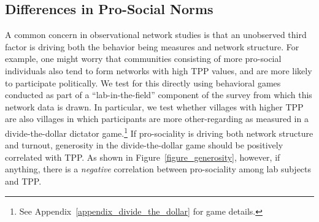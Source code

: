 \documentclass[12pt]{article}
\begin{document}

\subsection{Differences in Pro-Social Norms}

A common concern in observational network studies is that an unobserved third factor is driving both the behavior being measures and network structure. For example, one might worry that communities consisting of more pro-social individuals also tend to form networks with high TPP values, and are more likely to participate politically. We test for this directly using behavioral games conducted as part of a ``lab-in-the-field'' component of the survey from which this network data is drawn. In particular, we test whether villages with higher TPP are also villages in which participants are more other-regarding as measured in a divide-the-dollar dictator game.\footnote{See Appendix~\ref{appendix_divide_the_dollar} for game details.} If pro-sociality is driving both network structure and turnout, generosity in the divide-the-dollar game should be positively correlated with TPP. As shown in Figure~\ref{figure_generosity}, however, if anything, there is a \emph{negative} correlation between pro-sociality among lab subjects and TPP.
\end{document}
